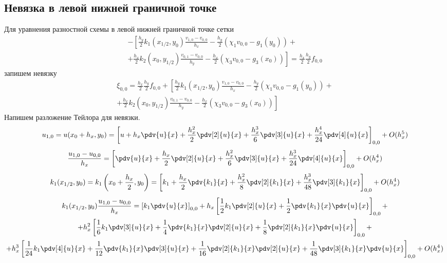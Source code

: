 \subsection{Невязка в левой нижней граничной точке}
Для уравнения разностной схемы в левой нижней граничной точке сетки
\begin{multline*}
    - \left[
    \frac{h_y}{2}  k_1(x_{1/2},y_{0}) \frac{v_{1,0} - v_{0,0}}{h_x} - \frac{h_y}{2} \left( \chi_1 v_{0,0} - g_1(y_{0}) \right) + \right. \\
    \left. +
    \frac{h_x}{2}  k_2(x_{0},y_{1/2}) \frac{v_{0,1} - v_{0,0}}{h_y} - \frac{h_x}{2} \left( \chi_3 v_{0,0} - g_3(x_{0}) \right)
    \right] =
    \frac{h_x}{2} \frac{h_y}{2} f_{0,0}
\end{multline*}
запишем невязку
\begin{multline*}
    \xi_{0,0} = \frac{h_x}{2} \frac{h_y}{2} f_{0,0} + \left[
    \frac{h_y}{2}  k_1(x_{1/2},y_{0}) \frac{v_{1,0} - v_{0,0}}{h_x} - \frac{h_y}{2} \left( \chi_1 v_{0,0} - g_1(y_{0}) \right) + \right. \\
    \left. +
    \frac{h_x}{2}  k_2(x_{0},y_{1/2}) \frac{v_{0,1} - v_{0,0}}{h_y} - \frac{h_x}{2} \left( \chi_3 v_{0,0} - g_3(x_{0}) \right)
    \right]
\end{multline*}
Напишем разложение Тейлора для невязки.
\[
    u_{1,0} = u(x_{0} + h_x, y_{0}) = \left[ u + h_x \pdv{u}{x} + \frac{h_x^2}{2} \pdv[2]{u}{x} +
    \frac{h_x^3}{6} \pdv[3]{u}{x} + \frac{h_x^4}{24} \pdv[4]{u}{x} \right]_{0,0} + O(h_x^5)
\]
\[
    \frac{u_{1,0} - u_{0,0}}{h_x} = \left[ \pdv{u}{x} + \frac{h_x}{2} \pdv[2]{u}{x} +
    \frac{h_x^2}{6} \pdv[3]{u}{x} + \frac{h_x^3}{24} \pdv[4]{u}{x} \right]_{0,0} + O(h_x^4)
\]
\[
    k_1(x_{1/2},y_{0}) = k_1 \left( x_{0} + \frac{h_x}{2},y_{0} \right) = \left[
        k_1 + \frac{h_x}{2} \pdv{k_1}{x} + \frac{h_x^2}{8} \pdv[2]{k_1}{x} + \frac{h_x^3}{48} \pdv[3]{k_1}{x}
    \right]_{0,0} + O(h_x^4)
\]
\begin{multline*}
    k_1(x_{1/2},y_{0}) \frac{u_{1,0} - u_{0,0}}{h_x} = \left[ k_1 \pdv{u}{x} \right]_{0,0} +
    h_x \left[ \frac{1}{2} k_1 \pdv[2]{u}{x} + \frac{1}{2} \pdv{k_1}{x} \pdv{u}{x} \right]_{0,0} + \\
    + h_x^2 \left[ \frac{1}{6} k_1 \pdv[3]{u}{x} + \frac{1}{4} \pdv{k_1}{x} \pdv[2]{u}{x} + \frac{1}{8} \pdv[2]{k_1}{x} \pdv{u}{x} \right]_{0,0} + \\
    + h_x^3 \left[ \frac{1}{24} k_1 \pdv[4]{u}{x} + \frac{1}{12} \pdv{k_1}{x} \pdv[3]{u}{x} + \frac{1}{16} \pdv[2]{k_1}{x} \pdv[2]{u}{x} + \frac{1}{48} \pdv[3]{k_1}{x} \pdv{u}{x} \right]_{0,0} + O(h_x^4)
\end{multline*}

